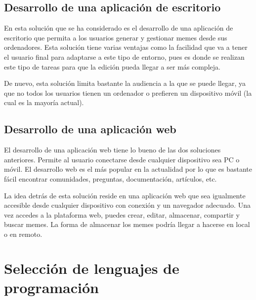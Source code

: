 \subsection{Desarrollo de una aplicación de escritorio}

En esta solución que se ha considerado es el desarrollo de una aplicación de escritorio que permita a los usuarios generar y gestionar memes desde sus ordenadores. Esta solución tiene varias ventajas como la facilidad que va a tener el usuario final para adaptarse a este tipo de entorno, pues es donde se realizan este tipo de tareas para que la edición pueda llegar a ser más compleja.

De nuevo, esta solución limita bastante la audiencia a la que se puede llegar, ya que no todos los usuarios tienen un ordenador o prefieren un dispositivo móvil (la cual es la mayoría actual).

\subsection{Desarrollo de una aplicación web}

El desarrollo de una aplicación web tiene lo bueno de las dos soluciones anteriores. Permite al usuario conectarse desde cualquier dispositivo sea PC o móvil. El desarrollo web es el más popular en la actualidad por lo que es bastante fácil encontrar comunidades, preguntas, documentación, artículos, etc.

La idea detrás de esta solución reside en una aplicación web que sea igualmente accesible desde cualquier dispositivo con conexión y un navegador adecuado. Una vez accedes a la plataforma web, puedes crear, editar, almacenar, compartir y buscar memes. La forma de almacenar los memes podría llegar a hacerse en local o en remoto.

\section{Selección de lenguajes de programación}
